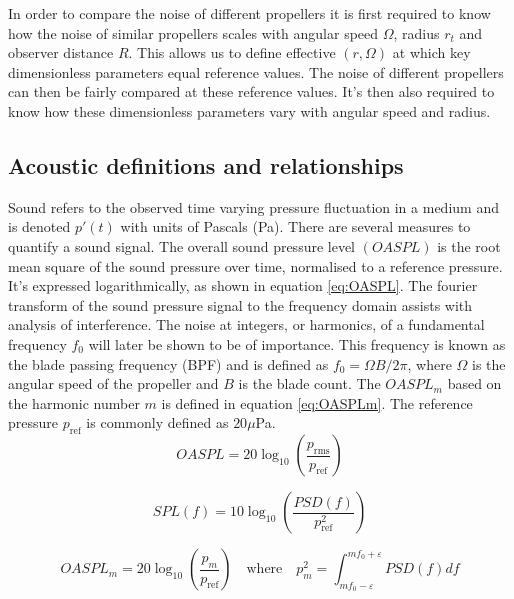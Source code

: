 \documentclass[12pt,a4paper]{article}
\begin{document}
In order to compare the noise of different propellers it is first required to know how the noise of similar propellers scales with 
angular speed $\Omega$, radius $r_t$ and observer distance $R$.
This allows us to define effective $(r, \Omega)$ at which key dimensionless parameters equal reference values.
The noise of different propellers can then be fairly compared at these reference values.
It's then also required to know how these dimensionless parameters vary with angular speed and radius.

\subsection{Acoustic definitions and relationships}
Sound refers to the observed time varying pressure fluctuation in a medium and is denoted $p'(t)$ with units of Pascals (Pa).
There are several measures to quantify a sound signal.
The overall sound pressure level $(OASPL)$ is the root mean square of the sound pressure over time, normalised to a reference pressure.
It's expressed logarithmically, as shown in equation \ref{eq:OASPL}.
The fourier transform of the sound pressure signal to the frequency domain assists with analysis of interference.
The noise at integers, or harmonics, of a fundamental frequency $f_0$ will later be shown to be of importance.
This frequency is known as the blade passing frequency (BPF) and is defined as $f_0 = \Omega B/ 2\pi$, where $\Omega$ is the angular speed of the propeller and $B$ is the blade count.
The $OASPL_m$ based on the harmonic number $m$ is defined in equation \ref{eq:OASPLm}.
The reference pressure $p_\text{ref}$ is commonly defined as $20 \mu$Pa.
\begin{equation}
    OASPL = 20 \log_{10} \left( \frac{p_\text{rms}}{p_\text{ref}} \right) \label{eq:OASPL}
\end{equation}

\begin{equation}
    SPL(f) = 10 \log_{10} \left( \frac{PSD(f)}{p^2_\text{ref}} \right) \label{eq:SPL_f}
\end{equation}

\begin{equation}
    OASPL_m = 20 \log_{10} \left( \frac{ p_m }{p_\text{ref}} \right) \label{eq:OASPLm} \quad \text{where} \quad p_m^2 = \int^{m f_0 + \varepsilon}_{m f_0 - \varepsilon} PSD(f) df
\end{equation}

\end{document}
